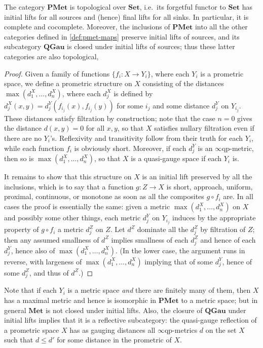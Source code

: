 \documentclass{article}
\def\eqp{$\infty$qp}
\def\Set{\mathbf{Set}}
\def\PMet{\mathbf{PMet}}
\def\QGau{\mathbf{QGau}}
\def\Met{\mathbf{Met}}
\begin{document}
\begin{thm}
  The category $\PMet$ is topological over $\Set$, i.e.\ its forgetful functor to $\Set$ has initial lifts for all sources and (hence) final lifts for all sinks.
  In particular, it is complete and cocomplete.
  Moreover, the inclusions of $\PMet$ into all the other categories defined in \cref{def:pmet-maps} preserve initial lifts of sources, and its subcategory $\QGau$ is closed under initial lifts of sources; thus these latter categories are also topological,
\end{thm}
\begin{proof}
  Given a family of functions $\{f_i : X \to Y_i\}$, where each $Y_i$ is a prometric space, we define a prometric structure on $X$ consisting of the distances $\max(d^X_1,\dots,d^X_n)$, where each $d^X_j$ is defined by $d^X_j(x,y) = d_j^Y(f_{i_j}(x),f_{i_j}(y))$ for some $i_j$ and some distance $d_j^Y$ on $Y_{i_j}$.
  These distances satisfy filtration by construction; note that the case $n=0$ gives the distance $d(x,y)=0$ for all $x,y$, so that $X$ satisfies nullary filtration even if there are no $Y_i$'s.
  Reflexivity and transitivity follow from their truth for each $Y_i$, while each function $f_i$ is obviously short.
  Moreover, if each $d_j^Y$ is an \eqp-metric, then so is $\max(d^X_1,\dots,d^X_n)$, so that $X$ is a quasi-gauge space if each $Y_i$ is.

  It remains to show that this structure on $X$ is an initial lift preserved by all the inclusions, which is to say that a function $g:Z\to X$ is short, approach, uniform, proximal, continuous, or monotone as soon as all the composites $g\circ f_i$ are.
  In all cases the proof is essentially the same: given a metric $\max(d^X_1,\dots,d^X_n)$ on $X$ and possibly some other things, each metric $d_j^Y$ on $Y_{i_j}$ induces by the appropriate property of $g\circ f_i$ a metric $d^Z_j$ on $Z$.
  Let $d^Z$ dominate all the $d^Z_j$ by filtration of $Z$; then any assumed smallness of $d^Z$ implies smallness of each $d^Z_j$ and hence of each $d_j^Y$, hence also of $\max(d^X_1,\dots,d^X_n)$.
  (In the lower case, the argument runs in reverse, with largeness of $\max(d^X_1,\dots,d^X_n)$ implying that of some $d_j^Y$, hence of some $d^Z_j$, and thus of $d^Z$.)
\end{proof}

Note that if each $Y_i$ is a metric space \emph{and} there are finitely many of them, then $X$ has a maximal metric and hence is isomorphic in $\PMet$ to a metric space; but in general $\Met$ is not closed under initial lifts.
Also, the closure of $\QGau$ under initial lifts implies that it is a reflective subcategory: the quasi-gauge reflection of a prometric space $X$ has as gauging distances all \eqp-metrics $d$ on the set $X$ such that $d\le d'$ for some distance in the prometric of $X$.
\end{document}
